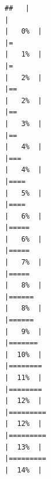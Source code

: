 \documentclass[
]{book}
\begin{document}
\begin{verbatim}
##   |                                                                              |                                                                      |   0%  |                                                                              |=                                                                     |   1%  |                                                                              |=                                                                     |   2%  |                                                                              |==                                                                    |   2%  |                                                                              |==                                                                    |   3%  |                                                                              |==                                                                    |   4%  |                                                                              |===                                                                   |   4%  |                                                                              |====                                                                  |   5%  |                                                                              |====                                                                  |   6%  |                                                                              |=====                                                                 |   6%  |                                                                              |=====                                                                 |   7%  |                                                                              |=====                                                                 |   8%  |                                                                              |======                                                                |   8%  |                                                                              |======                                                                |   9%  |                                                                              |=======                                                               |  10%  |                                                                              |========                                                              |  11%  |                                                                              |========                                                              |  12%  |                                                                              |=========                                                             |  12%  |                                                                              |=========                                                             |  13%  |                                                                              |=========                                                             |  14%  |                                                                              
\end{verbatim}
\end{document}
